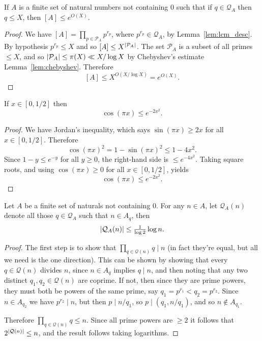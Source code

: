 \begin{lemma}\label{lem:smooth_lcm}
If $A$ is a finite set of natural numbers not containing $0$ such that if $q\in\mathcal{Q}_A$ then $q\leq X$, then $[A]\leq e^{O(X)}$.
\end{lemma}
\begin{proof}
  We have $[A]=\prod_{p\in\mathcal{P}_A}p^{r_p}$, where $p^{r_p}\in \mathcal{Q}_A$, by Lemma~\ref{lem:lcm_desc}. By hypothesis $p^{r_p}\leq X$ and so $[A]\leq X^{\left\lvert \mathcal{P}_A\right\rvert}$. The set $\mathcal{P}_A$ is a subset of all primes $\leq X$, and so $\left\lvert \mathcal{P}_A\right\rvert\leq \pi(X)\ll X/\log X$ by Chebyshev's estimate Lemma~\ref{lem:chebyshev}. Therefore
  \[[A]\leq X^{O(X/\log X)}=e^{O(X)}.\]
\end{proof}

\begin{lemma}\label{lem:cos_bound}
  \leanok
If $x\in [0,1/2]$ then
\[\cos(\pi x) \leq e^{-2x^2}.\]
\end{lemma}
\begin{proof}
  \leanok
We have Jordan's inequality, which says $\sin(\pi x)\geq 2x$ for all $x\in[0,1/2]$. Therefore
\[\cos(\pi x)^2 = 1-\sin(\pi x)^2\leq 1-4x^2.\]
Since $1-y\leq e^{-y}$ for all $y\geq 0$, the right-hand side is $\leq e^{-4x^2}$. Taking square roots, and using $\cos(\pi x)\geq 0$ for all $x\in[0,1/2]$, yields
\[\cos(\pi x) \leq e^{-2x^2}.\]
\end{proof}

\begin{lemma}\label{lem:triv_q_bound}
  \leanok
Let $A$ be a finite set of naturals not containing $0$. For any $n\in A$, let $\mathcal{Q}_A(n)$ denote all those $q\in \mathcal{Q}_A$ such that $n\in A_q$, then
\[\left\lvert \mathcal{Q}_A(n)\right\rvert\leq  \tfrac{1}{\log 2}\log n.\]
\end{lemma}
\begin{proof}
  \leanok
The first step is to show that $\prod_{q\in\mathcal{Q}(n)}q\mid n$ (in fact they're equal, but all we need is the one direction). This can be shown by showing that every $q\in\mathcal{Q}(n)$ divides $n$, since $n\in A_q$ implies $q\mid n$,  and then noting that any two distinct $q_1,q_2\in \mathcal{Q}(n)$ are coprime. If not, then since they are prime powers, they must both be powers of the same prime, say $q_1=p^{r_1}< q_2=p^{r_2}$. Since $n\in A_{q_2}$ we have $p^{r_2}\mid n$, but then $p\mid n/q_1$, so $p\mid (q_1,n/q_1)$, and so $n\not\in A_{q_1}$.

Therefore $\prod_{q\in\mathcal{Q}(n)}q\leq n$. Since all prime powers are $\geq 2$ it follows that $2^{\left\lvert \mathcal{Q}(n)\right\rvert}\leq n$, and the result follows taking logarithms.
\end{proof}

